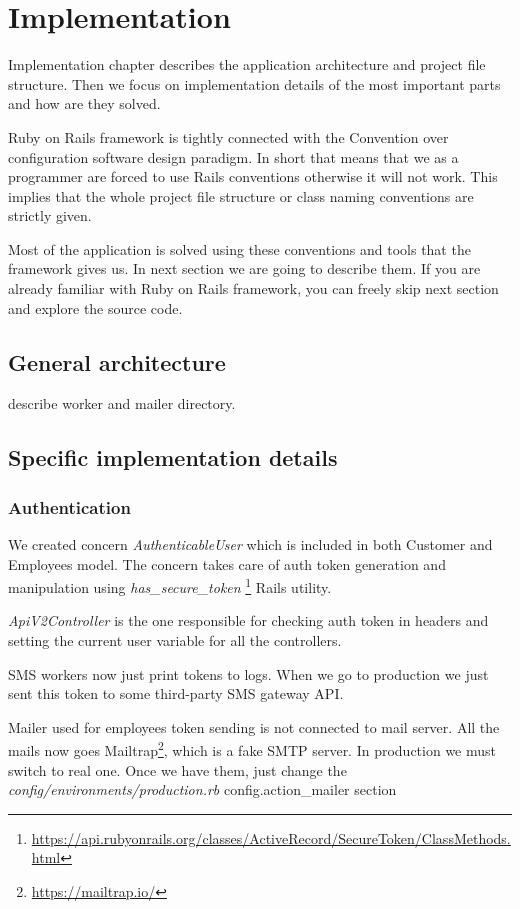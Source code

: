 \chapter{Implementation}
Implementation chapter describes the application architecture and project file structure. Then we focus on implementation details of the most important parts and how are they solved.

Ruby on Rails framework is tightly connected with the Convention over configuration software design paradigm. In short that means that we as a programmer are forced to use Rails conventions otherwise it will not work. This implies that the whole project file structure or class naming conventions are strictly given. 

Most of the application is solved using these conventions and tools that the framework gives us. In next section we are going to describe them. If you are already familiar with Ruby on Rails framework, you can freely skip next section and explore the source code. 

\section {General architecture}

describe worker and mailer directory.


\section {Specific implementation details}
\subsection {Authentication}
We created concern \textit{AuthenticableUser} which is included in both Customer and Employees model. The concern takes care of auth token generation and manipulation using \textit{has\_secure\_token} \footnote{\url{https://api.rubyonrails.org/classes/ActiveRecord/SecureToken/ClassMethods.html}} Rails utility. 

\textit{ApiV2Controller} is the one responsible for checking auth token in headers and setting the current user variable for all the controllers.

SMS workers now just print tokens to logs. When we go to production we just sent this token to some third-party SMS gateway API.

Mailer used for employees token sending is not connected to mail server. All the mails now goes Mailtrap\footnote{\url{https://mailtrap.io/}}, which is a fake SMTP server. In production we must switch to real one. Once we have them, just change the \textit{config/environments/production.rb} config.action\_mailer section

